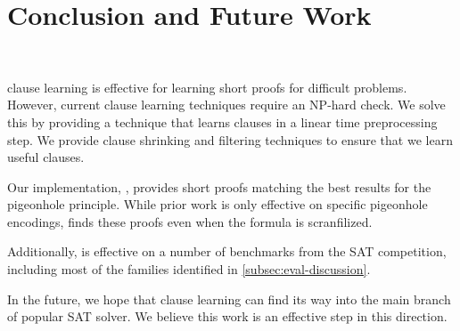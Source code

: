 \section{Conclusion and Future Work}~\label{sec:conclusion}


\pr clause learning is effective for learning short proofs for 
difficult problems. However, current \pr clause learning techniques require
an NP-hard check. We solve this by providing a technique that learns \pr clauses
in a linear time preprocessing step. We provide clause shrinking and filtering 
techniques to ensure that we learn useful \pr clauses.

Our implementation, \tool, provides short \pr proofs matching the best results for 
the pigeonhole principle. While prior work is only effective on specific pigeonhole
encodings, \tool finds these proofs even when the formula is scranfilized.

Additionally, \tool is effective on a number of benchmarks from the SAT competition,
including most of the families identified in \autoref{subsec:eval-discussion}.

In the future, we hope that \pr clause learning can find its way into the main branch
of popular SAT solver. We believe this work is an effective step in this direction.

